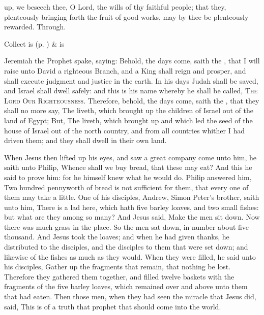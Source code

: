\collect
{} up, we beseech thee, O Lord, the wills of thy faithful people; that they, plenteously bringing forth the fruit of good works, may by thee be plenteously rewarded. Through.
\begin{rubric}
     Collect is  (p. \pageref{SPSaints}) \&  is 
\end{rubric}

 Jeremiah the Prophet spake, saying: Behold, the days come, saith the , that I will raise unto David a righteous Branch, and a King shall reign and prosper, and shall execute judgment and justice in the earth. In his days Judah shall be saved, and Israel shall dwell safely: and this is his name whereby he shall be called, \textsc{The Lord Our Righteousness}. Therefore, behold, the days come, saith the , that they shall no more say, The  liveth, which brought up the children of Israel out of the land of Egypt; But, The  liveth, which brought up and which led the seed of the house of Israel out of the north country, and from all countries whither I had driven them; and they shall dwell in their own land.



\clearpage
{}
 When Jesus then lifted up his eyes, and saw a great company come unto him, he saith unto Philip, Whence shall we buy bread, that these may eat? And this he said to prove him: for he himself knew what he would do. Philip answered him, Two hundred pennyworth of bread is not sufficient for them, that every one of them may take a little. One of his disciples, Andrew, Simon Peter's brother, saith unto him, There is a lad here, which hath five barley loaves, and two small fishes: but what are they among so many? And Jesus said, Make the men sit down. Now there was much grass in the place. So the men sat down, in number about five thousand. And Jesus took the loaves; and when he had given thanks, he distributed to the disciples, and the disciples to them that were set down; and likewise of the fishes as much as they would. When they were filled, he said unto his disciples, Gather up the fragments that remain, that nothing be lost. Therefore they gathered them together, and filled twelve baskets with the fragments of the five barley loaves, which remained over and above unto them that had eaten. Then those men, when they had seen the miracle that Jesus did, said, This is of a truth that prophet that should come into the world.

